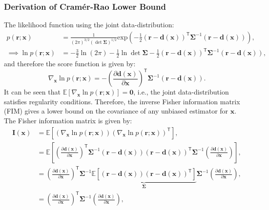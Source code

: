 \documentclass[11pt]{article}
\newcommand{\br}{\mathbf{r}}
\newcommand{\bd}{\mathbf{d}}
\newcommand{\bx}{\mathbf{x}}
\newcommand{\bI}{\mathbf{I}}
\newcommand{\Ex}{\mathbb{E}}
\newcommand{\TT}{\mathsf{T}}
\newcommand{\zerovec}{\boldsymbol{0}}
\newcommand{\bSigma}{\boldsymbol{\Sigma}}
\begin{document}

\subsubsection*{Derivation of Cram\'er-Rao Lower Bound}
\label{subsubsec:crlb}

The likelihood function using the joint data-distribution:
\begin{equation}
\begin{split}
	p(\br ; \bx) &= \frac{1}{(2\pi)^{3/2} (\det \bSigma)^{1/2}} \mathrm{exp} \left( -\frac{1}{2} (\br - \bd(\bx))^{\TT} \bSigma^{-1} (\br - \bd(\bx)) \right), \\
	\implies \ln p(\br ; \bx) &= -\frac{3}{2} \ln (2\pi) - \frac{1}{2} \ln \det \bSigma -\frac{1}{2} (\br - \bd(\bx))^{\TT} \bSigma^{-1} (\br - \bd(\bx)),
\end{split}
\label{eq:likelihood}
\end{equation}
and therefore the score function is given by:
\begin{equation}
	\nabla_{\bx} \ln p(\br ; \bx) = - \left( \frac{\partial \bd(\bx)}{\partial \bx} \right)^{\TT} \bSigma^{-1} \left( \br - \bd(\bx) \right).
\label{eq:regularity}
\end{equation}
It can be seen that $\displaystyle \Ex \left[ \nabla_{\bx} \ln p(\br ; \bx) \right] = \zerovec$, i.e., the joint data-distribution satisfies regularity conditions. Therefore, the inverse Fisher information matrix (FIM) gives a lower bound on the covariance of any unbiased estimator for $\bx$. The Fisher information matrix is given by:
\begin{equation}
\begin{split}
	\bI(\bx) &= \Ex \left[ \left( \nabla_{\bx} \ln p(\br ; \bx) \right) \left( \nabla_{\bx} \ln p(\br ; \bx) \right)^{\TT} \right], \\
	&= \Ex \left[ \left( \frac{\partial \bd(\bx)}{\partial \bx} \right)^{\TT} \bSigma^{-1} \left( \br - \bd(\bx) \right) \left( \br - \bd(\bx) \right)^{\TT} \bSigma^{-1} \left( \frac{\partial \bd(\bx)}{\partial \bx} \right) \right], \\
	&= \left( \frac{\partial \bd(\bx)}{\partial \bx} \right)^{\TT} \bSigma^{-1} \underbrace{\Ex \left[ \left( \br - \bd(\bx) \right) \left( \br - \bd(\bx) \right)^{\TT} \right]}_{\bSigma} \bSigma^{-1} \left( \frac{\partial \bd(\bx)}{\partial \bx} \right), \\
	&= \left( \frac{\partial \bd(\bx)}{\partial \bx} \right)^{\TT} \bSigma^{-1} \left( \frac{\partial \bd(\bx)}{\partial \bx} \right),
\end{split}
\label{eq:fim}
\end{equation}
\end{document}
